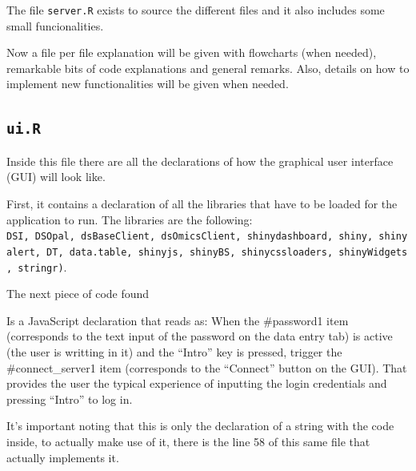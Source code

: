 \documentclass[
]{book}
\newenvironment{Shaded}{\begin{snugshade}}{\end{snugshade}}
\newcommand{\NormalTok}[1]{#1}
\newcommand{\OtherTok}[1]{\textcolor[rgb]{0.56,0.35,0.01}{#1}}
\newcommand{\StringTok}[1]{\textcolor[rgb]{0.31,0.60,0.02}{#1}}
\begin{document}
The file \texttt{server.R} exists to source the different files and it also includes some small funcionalities.

Now a file per file explanation will be given with flowcharts (when needed), remarkable bits of code explanations and general remarks. Also, details on how to implement new functionalities will be given when needed.

\hypertarget{ui.r}{%
\subsection{\texorpdfstring{\texttt{ui.R}}{ui.R}}\label{ui.r}}

Inside this file there are all the declarations of how the graphical user interface (GUI) will look like.

First, it contains a declaration of all the libraries that have to be loaded for the application to run. The libraries are the following: \texttt{DSI,\ DSOpal,\ dsBaseClient,\ dsOmicsClient,\ shinydashboard,\ shiny,\ shinyalert,\ DT,\ data.table,\ shinyjs,\ shinyBS,\ shinycssloaders,\ shinyWidgets,\ stringr)}.

The next piece of code found

\begin{Shaded}
\end{Shaded}

Is a JavaScript declaration that reads as: When the \#password1 item (corresponds to the text input of the password on the data entry tab) is active (the user is writting in it) and the ``Intro'' key is pressed, trigger the \#connect\_server1 item (corresponds to the ``Connect'' button on the GUI). That provides the user the typical experience of inputting the login credentials and pressing ``Intro'' to log in.

It's important noting that this is only the declaration of a string with the code inside, to actually make use of it, there is the line 58 of this same file that actually implements it.
\end{document}
